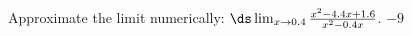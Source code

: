 {Approximate  the limit numerically: $\ds \lim_{x\to 0.4} \frac{x^2-4.4 x+1.6}{x^2-0.4 x}$.
}
{$-9$
}


